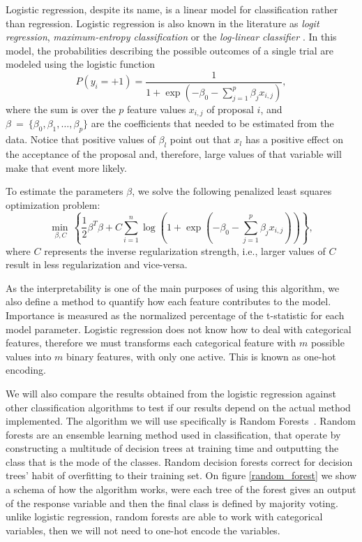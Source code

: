 Logistic regression, despite its name, is a linear model for classification rather than regression. Logistic regression is also known in the literature as \emph{logit regression}, \emph{maximum-entropy classification} or the \emph{log-linear classifier} \cite{logit}. In this model, the probabilities describing the possible outcomes of a single trial are modeled using the logistic function
\begin{equation}
P(y_i=+1) = \frac{1}{1+ \exp\left({-\beta_0-\sum^p_{j=1}\beta_jx_{i,j}}\right)},
\end{equation}
where the sum is over the $p$ feature values $x_{i,j}$ of proposal $i$, and $\beta~=~\{\beta_0,\beta_1,\hdots,\beta_p\}$ are the coefficients that needed to be estimated from the data. Notice that positive values of $\beta_l$ point out that $x_l$ has a positive effect on the acceptance of the proposal and, therefore, large values of that variable will make that event more likely.

To estimate the parameters $\beta$, we solve the following penalized least squares optimization problem:
\begin{equation}
\underset{\beta, C}{\min\,} \left\{\frac{1}{2}\beta^T \beta + C \sum_{i=1}^n \log\left(1+ \exp\left({-\beta_0-\sum^p_{j=1}\beta_jx_{i,j}}\right)\right)\right\},
\end{equation}
where $C$ represents the inverse regularization strength, i.e., larger values of $C$ result in less regularization and vice-versa.

As the interpretability is one of the main purposes of using this algorithm, we also define a method to quantify how each feature contributes to the model. Importance is measured as the normalized percentage of the t-statistic for each model parameter. Logistic regression does not know how to deal with categorical features, therefore we must transforms each categorical feature with $m$ possible values into $m$ binary features, with only one active. This is known as one-hot encoding.

We will also compare the results obtained from the logistic regression against other classification algorithms to test if our results depend on the actual method implemented. The algorithm we will use specifically is Random Forests~\cite{rf}. Random forests are an ensemble learning method used in classification, that operate by constructing a multitude of decision trees at training time and outputting the class that is the mode of the classes. Random decision forests correct for decision trees' habit of overfitting to their training set. On figure \ref{random_forest} we show a schema of how the algorithm works, were each tree of the forest gives an output of the response variable and then the final class is defined by majority voting. unlike logistic regression, random forests are able to work with categorical variables, then we will not need to one-hot encode the variables.

